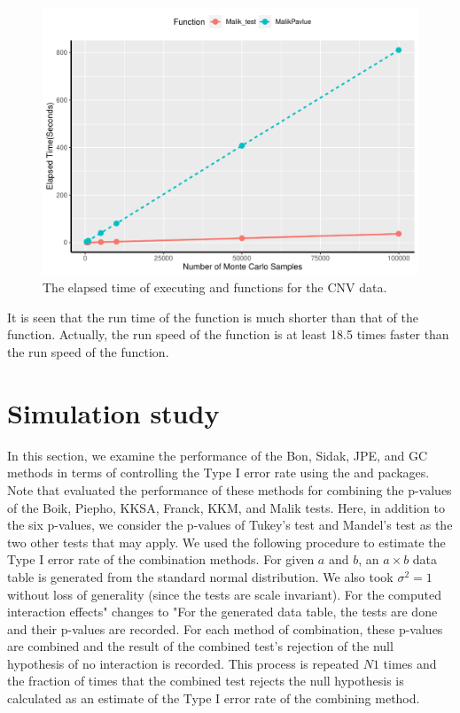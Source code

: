 \begin{figure}[tbp]
	\centering
	\includegraphics[scale=0.7]{elapsedtime.pdf}
	\caption{The elapsed time of executing  and  functions for the CNV data.}
	\label{fig:3}
\end{figure}

It is seen that the {run time of the  function is much shorter} than that of the  function. Actually, the run speed of the  function is at least 18.5 times faster than the run speed of the  function.

\section{Simulation study}
In this section, we examine the performance of the Bon, Sidak, JPE, and GC methods in terms of controlling the {Type I error} rate using the  and  packages. Note that \citet{SKK:2018} evaluated the performance of these {methods for combining the p-values of the Boik, Piepho, KKSA, Franck, KKM, and Malik tests}. Here, in addition to the six p-values, we consider the p-values {of Tukey's test} and Mandel's test \citep{Tukey:1949, Mandel:1961} as the two other tests that may apply. We used the following procedure to estimate the {Type I error} rate of the combination methods. For given $a$ and $b$, an $a\times b$ data table is generated from the standard normal distribution. We also took $\sigma^2=1$ without loss of generality (since the tests are scale invariant). For the computed interaction effects" changes to "For the generated data table, the tests are done and their p-values are recorded. For each method of combination, these p-values are combined and the result of the combined test's rejection of the null hypothesis of no interaction is recorded. This process is repeated $N1$ times and the fraction of times that the combined test rejects the null hypothesis is calculated as {an estimate of the Type} { I} error rate of the {combining} method. 

